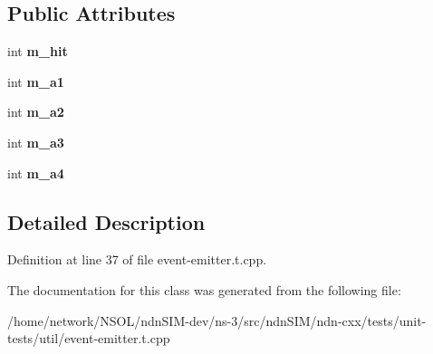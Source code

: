 \subsection*{Public Attributes}
\begin{DoxyCompactItemize}
\item 
int {\bfseries m\+\_\+hit}\hypertarget{classndn_1_1util_1_1tests_1_1EventEmitterTester_a1c763c4cb61d821bd68d3caadc176b7b}{}\label{classndn_1_1util_1_1tests_1_1EventEmitterTester_a1c763c4cb61d821bd68d3caadc176b7b}

\item 
int {\bfseries m\+\_\+a1}\hypertarget{classndn_1_1util_1_1tests_1_1EventEmitterTester_af4dee3a40bce4074225b8e693c428587}{}\label{classndn_1_1util_1_1tests_1_1EventEmitterTester_af4dee3a40bce4074225b8e693c428587}

\item 
int {\bfseries m\+\_\+a2}\hypertarget{classndn_1_1util_1_1tests_1_1EventEmitterTester_a68a00ee2d6d64a94fd8b047ecb13dd98}{}\label{classndn_1_1util_1_1tests_1_1EventEmitterTester_a68a00ee2d6d64a94fd8b047ecb13dd98}

\item 
int {\bfseries m\+\_\+a3}\hypertarget{classndn_1_1util_1_1tests_1_1EventEmitterTester_a18510c6e78cdc96dc549b6196b4381f5}{}\label{classndn_1_1util_1_1tests_1_1EventEmitterTester_a18510c6e78cdc96dc549b6196b4381f5}

\item 
int {\bfseries m\+\_\+a4}\hypertarget{classndn_1_1util_1_1tests_1_1EventEmitterTester_a39bbe20aa2bbb83e4510c8d59571b974}{}\label{classndn_1_1util_1_1tests_1_1EventEmitterTester_a39bbe20aa2bbb83e4510c8d59571b974}

\end{DoxyCompactItemize}


\subsection{Detailed Description}


Definition at line 37 of file event-\/emitter.\+t.\+cpp.



The documentation for this class was generated from the following file\+:\begin{DoxyCompactItemize}
\item 
/home/network/\+N\+S\+O\+L/ndn\+S\+I\+M-\/dev/ns-\/3/src/ndn\+S\+I\+M/ndn-\/cxx/tests/unit-\/tests/util/event-\/emitter.\+t.\+cpp\end{DoxyCompactItemize}
